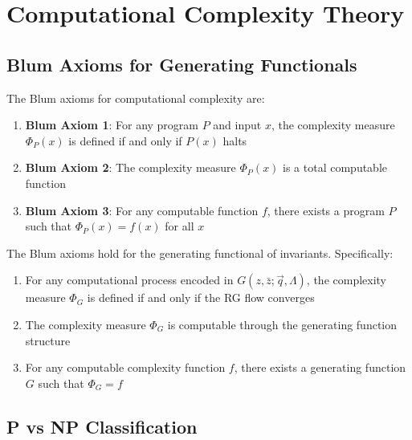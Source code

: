 
\section{Computational Complexity Theory}

\subsection{Blum Axioms for Generating Functionals}

\begin{definition}
\label{def:blum-axioms}
The Blum axioms for computational complexity are:
\begin{enumerate}
\item \textbf{Blum Axiom 1}: For any program $P$ and input $x$, the complexity measure $\Phi_P(x)$ is defined if and only if $P(x)$ halts
\item \textbf{Blum Axiom 2}: The complexity measure $\Phi_P(x)$ is a total computable function
\item \textbf{Blum Axiom 3}: For any computable function $f$, there exists a program $P$ such that $\Phi_P(x) = f(x)$ for all $x$
\end{enumerate}
\end{definition}

\begin{theorem}
\label{thm:blum-generating}
The Blum axioms hold for the generating functional of invariants. Specifically:
\begin{enumerate}
\item For any computational process encoded in $G(z, \bar{z}; \vec{q}, \Lambda)$, the complexity measure $\Phi_G$ is defined if and only if the RG flow converges
\item The complexity measure $\Phi_G$ is computable through the generating function structure
\item For any computable complexity function $f$, there exists a generating function $G$ such that $\Phi_G = f$
\end{enumerate}
\end{theorem}

\subsection{P vs NP Classification}

